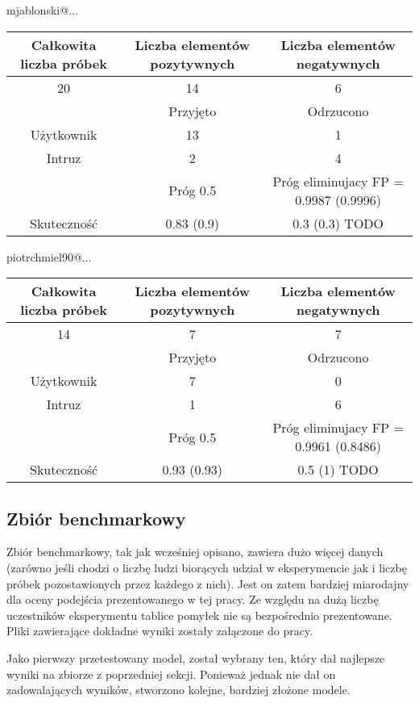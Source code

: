 		mjablonski@... \\
		\begin{tabular}{|c|c|c|}
		\hline
		Całkowita liczba próbek & Liczba elementów pozytywnych & Liczba elementów negatywnych \\ \hline
			    	  20  & 14             & 6 \\ \hline
						    & Przyjęto   & Odrzucono \\ \hline
		Użytkownik  & 13             & 1 \\ \hline
		Intruz		    & 2             & 4 \\ \hline
						    & Próg 0.5  	& Próg eliminujacy FP = 0.9987 (0.9996) \\ \hline
		Skuteczność & 0.83 (0.9)       & 0.3 (0.3) TODO\\ \hline
		\end{tabular}

		piotrchmiel90@... \\
		\begin{tabular}{|c|c|c|}
		\hline
		Całkowita liczba próbek & Liczba elementów pozytywnych & Liczba elementów negatywnych \\ \hline
		14  & 7 & 7 \\ \hline
		& Przyjęto & Odrzucono \\ \hline
		Użytkownik & 7 & 0 \\ \hline
		Intruz & 1 & 6 \\ \hline
		& Próg 0.5 & Próg eliminujacy FP = 0.9961 (0.8486) \\ \hline
		Skuteczność & 0.93 (0.93) & 0.5 (1) TODO\\ \hline
		\end{tabular}
	\subsection{Zbiór benchmarkowy}
	Zbiór benchmarkowy, tak jak wcześniej opisano, zawiera dużo więcej danych (zarówno jeśli chodzi o liczbę ludzi biorących udział w eksperymencie jak i liczbę próbek pozostawionych przez każdego z nich). Jest on zatem bardziej miarodajny dla oceny podejścia prezentowanego w tej pracy. Ze względu na dużą liczbę uczestników eksperymentu tablice pomyłek nie są bezpośrednio prezentowane. Pliki zawierające dokładne wyniki zostały załączone do pracy.

	Jako pierwszy przetestowany model, został wybrany ten, który dał najlepsze wyniki na zbiorze z poprzedniej sekcji. Ponieważ jednak nie dał on zadowalających wyników, stworzono kolejne, bardziej złożone modele.
